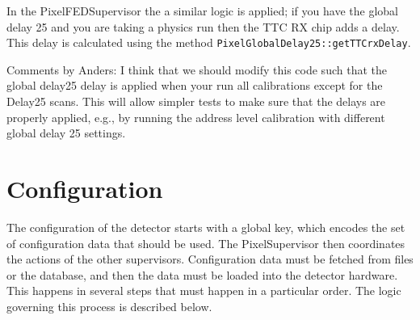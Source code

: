 In the PixelFEDSupervisor the a similar logic is applied; if you
have the global delay 25 and you are taking a physics run then 
the TTC RX chip adds a delay. This delay is calculated using the 
method {\tt PixelGlobalDelay25::getTTCrxDelay}.

Comments by Anders: I think that we should modify this code such that
the global delay25 delay is applied when your run all calibrations
except for the Delay25 scans. This will allow simpler tests to make
sure that the delays are properly applied, e.g., by running the 
address level calibration with different global delay 25 settings.

\clearpage

\section{Configuration}
\label{sec:configuration}
The configuration of the detector starts with a global key, which
encodes the set of configuration data that should be used. The
PixelSupervisor then coordinates the actions of the other
supervisors. Configuration data must be fetched from files or the
database, and then the data must be loaded into the detector
hardware. This happens in several steps that must happen in a
particular order. The logic governing this process is described below.

